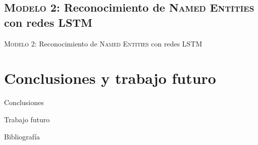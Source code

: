 \documentclass[10pt]{beamer}
\begin{document}
\subsection{\textsc{Modelo 2:} Reconocimiento de \textsc{Named Entities} con redes \textsc{LSTM}}

\begin{frame}{\textsc{Modelo 2:} Reconocimiento de \textsc{Named Entities} con redes \textsc{LSTM}}
\end{frame}

\section{Conclusiones y trabajo futuro}

\begin{frame}{Conclusiones}
\end{frame}

\begin{frame}{Trabajo futuro}
\end{frame}

\appendix
{}
\begin{frame}[allowframebreaks]{Bibliografía}

  
  

\end{frame}
\end{document}
